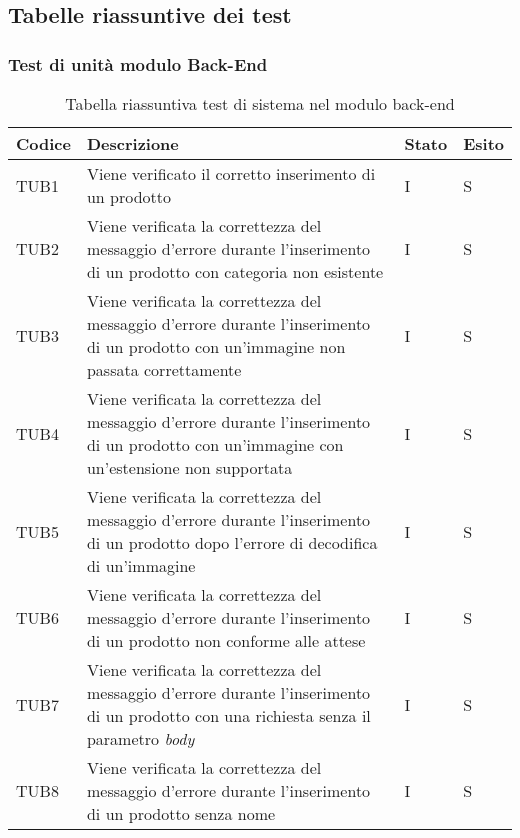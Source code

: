 \subsection{Tabelle riassuntive dei test}

\subsubsection{Test di unità modulo Back-End}
{

\centering
\renewcommand{\arraystretch}{2}
\begin{longtable}{C{2cm} C{9.6cm} C{1.5cm} C{1cm}}
\caption{Tabella riassuntiva test di sistema nel modulo back-end}\\
\textbf{Codice} &
\textbf{Descrizione}&
\textbf{Stato}&
\textbf{Esito}\\
\endhead


TUB1 & Viene verificato il corretto inserimento di un prodotto & I & S\\

TUB2 & Viene verificata la correttezza del messaggio d'errore durante l'inserimento di un prodotto con categoria non esistente & I & S\\


TUB3 & Viene verificata la correttezza del messaggio d'errore durante l'inserimento di un prodotto con un'immagine non passata correttamente & I & S\\


TUB4 & Viene verificata la correttezza del messaggio d'errore durante l'inserimento di un prodotto con un'immagine con un'estensione non supportata & I & S\\


TUB5 & Viene verificata la correttezza del messaggio d'errore durante l'inserimento di un prodotto dopo l'errore di decodifica di un'immagine & I & S\\

TUB6 & Viene verificata la correttezza del messaggio d'errore durante l'inserimento di un prodotto non conforme alle attese & I & S\\


TUB7 & Viene verificata la correttezza del messaggio d'errore durante l'inserimento di un prodotto con una richiesta senza il parametro \textit{body} & I & S\\


TUB8 & Viene verificata la correttezza del messaggio d'errore durante l'inserimento di un prodotto senza nome & I & S\\



\end{longtable}}
